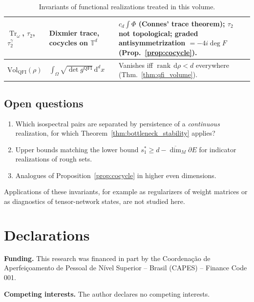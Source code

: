 \documentclass[11pt,a4paper,reqno]{amsart}
\theoremstyle{definition}
\numberwithin{equation}{section}
\newcommand{\Tr}{\operatorname{Tr}}
\newcommand{\rank}{\operatorname{rank}}
\newcommand{\dif}{\,\mathrm{d}}
\begin{document}
\begin{table}[htbp]
\begin{tabularx}{\textwidth}{@{} l >{\raggedright\arraybackslash}p{3.4cm} >{\raggedright\arraybackslash}X @{}}
\midrule
$\Tr_\omega$, $\tau_2$, $\tau_2^\gamma$ & Dixmier trace, cocycles on $\mathbb{T}^d$ & $c_d\int\Phi$ (Connes' trace theorem); $\tau_2$ not topological; graded antisymmetrization $= -4i\deg F$ (Prop.~\ref{prop:cocycle}). \\
\midrule
$\mathrm{Vol}_{\mathrm{QFI}}(\rho)$ & $\int_\Omega \sqrt{\det g^{\mathrm{QFI}}} \dif^d x$ & Vanishes iff $\rank\dif\rho < d$ everywhere (Thm.~\ref{thm:qfi_volume}). \\
\bottomrule
\end{tabularx}
\caption{Invariants of functional realizations treated in this volume.}
\label{tab:master_taxonomy}
\end{table}

\subsection*{Open questions}
\begin{enumerate}[label=(\roman*)]
    \item Which isospectral pairs are separated by persistence of a \emph{continuous} realization, for which Theorem~\ref{thm:bottleneck_stability} applies?
    \item Upper bounds matching the lower bound $s^*_1 \ge d - \overline{\dim}_M\partial E$ for indicator realizations of rough sets.
    \item Analogues of Proposition~\ref{prop:cocycle} in higher even dimensions.
\end{enumerate}
Applications of these invariants, for example as regularizers of weight matrices or as diagnostics of tensor-network states, are not studied here.

\section*{Declarations}

\noindent\textbf{Funding.} This research was financed in part by the
Coordena\c{c}\~ao de Aperfei\c{c}oamento de Pessoal de N\'ivel Superior -- Brasil
(CAPES) -- Finance Code 001.

\medskip\noindent\textbf{Competing interests.} The author declares no competing
interests.
\end{document}
